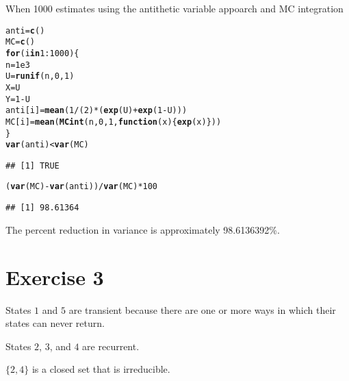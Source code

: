\documentclass{article}\usepackage[]{graphicx}\usepackage[]{color}
\makeatletter
\newcommand{\hlnum}[1]{\textcolor[rgb]{0.686,0.059,0.569}{#1}}%
\newcommand{\hlopt}[1]{\textcolor[rgb]{0,0,0}{#1}}%
\newcommand{\hlstd}[1]{\textcolor[rgb]{0.345,0.345,0.345}{#1}}%
\newcommand{\hlkwa}[1]{\textcolor[rgb]{0.161,0.373,0.58}{\textbf{#1}}}%
\newcommand{\hlkwb}[1]{\textcolor[rgb]{0.69,0.353,0.396}{#1}}%
\newcommand{\hlkwc}[1]{\textcolor[rgb]{0.333,0.667,0.333}{#1}}%
\newcommand{\hlkwd}[1]{\textcolor[rgb]{0.737,0.353,0.396}{\textbf{#1}}}%
\newenvironment{kframe}{%
 \def\at@end@of@kframe{}%
 \ifinner\ifhmode%
  \def\at@end@of@kframe{\end{minipage}}%
  \begin{minipage}{\columnwidth}%
 \fi\fi%
 \def\FrameCommand##1{\hskip\@totalleftmargin \hskip-\fboxsep
 \colorbox{shadecolor}{##1}\hskip-\fboxsep
     \hskip-\linewidth \hskip-\@totalleftmargin \hskip\columnwidth}%
 \MakeFramed {\advance\hsize-\width
   \@totalleftmargin\z@ \linewidth\hsize
   \@setminipage}}%
 {\par\unskip\endMakeFramed%
 \at@end@of@kframe}
\newenvironment{knitrout}{}{} %
\makeatother
\begin{document}
When 1000 estimates using the antithetic variable appoarch and MC integration
\begin{knitrout}
\color{fgcolor}\begin{kframe}
\begin{alltt}
\hlstd{anti} \hlkwb{=} \hlkwd{c}\hlstd{()}
\hlstd{MC} \hlkwb{=} \hlkwd{c}\hlstd{()}
\hlkwa{for}\hlstd{(i} \hlkwa{in} \hlnum{1}\hlopt{:}\hlnum{1000}\hlstd{)\{}
  \hlstd{n} \hlkwb{=} \hlnum{1e3}
  \hlstd{U} \hlkwb{=} \hlkwd{runif}\hlstd{(n,} \hlnum{0}\hlstd{,} \hlnum{1}\hlstd{)}
  \hlstd{X} \hlkwb{=} \hlstd{U}
  \hlstd{Y} \hlkwb{=} \hlnum{1} \hlopt{-} \hlstd{U}
  \hlstd{anti[i]} \hlkwb{=} \hlkwd{mean}\hlstd{(}\hlnum{1}\hlopt{/}\hlstd{(}\hlnum{2}\hlstd{)}\hlopt{*}\hlstd{(}\hlkwd{exp}\hlstd{(U)}\hlopt{+}\hlkwd{exp}\hlstd{(}\hlnum{1}\hlopt{-}\hlstd{U)))}
  \hlstd{MC[i]} \hlkwb{=} \hlkwd{mean}\hlstd{(}\hlkwd{MCint}\hlstd{(n,}\hlnum{0}\hlstd{,}\hlnum{1}\hlstd{,} \hlkwa{function}\hlstd{(}\hlkwc{x}\hlstd{)\{}\hlkwd{exp}\hlstd{(x)\}))}
 \hlstd{\}}
\hlkwd{var}\hlstd{(anti)} \hlopt{<} \hlkwd{var}\hlstd{(MC)}
\end{alltt}
\begin{verbatim}
## [1] TRUE
\end{verbatim}
\begin{alltt}
\hlstd{(}\hlkwd{var}\hlstd{(MC)} \hlopt{-} \hlkwd{var}\hlstd{(anti))}\hlopt{/}\hlkwd{var}\hlstd{(MC)}\hlopt{*}\hlnum{100}
\end{alltt}
\begin{verbatim}
## [1] 98.61364
\end{verbatim}
\end{kframe}
\end{knitrout}
The percent reduction in variance is approximately 98.6136392\%.

\section*{Exercise 3}
States $1$ and $5$ are transient because there are one or more ways in which their states can never return.

States $2$, $3$, and $4$ are recurrent.

$\{2,4\}$ is a closed set that is irreducible. 
\end{document}
